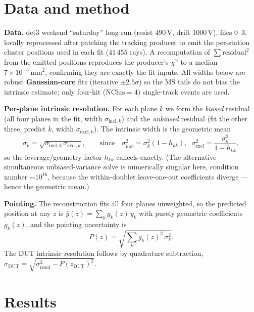 \documentclass[11pt]{article}
\newcommand{\mm}{\,\mathrm{mm}}
\begin{document}
\section{Data and method}
\textbf{Data.} det3 weekend ``saturday'' long run (resist $490$\,V, drift $1000$\,V), files
0--3, locally reprocessed after patching the tracking producer to emit the per-station cluster
positions used in each fit ($41\,455$ rays). A recomputation of $\sum\text{residual}^2$ from
the emitted positions reproduces the producer's $\chi^2$ to a median $7\times10^{-4}\mm^2$,
confirming they are exactly the fit inputs. All widths below are robust \textbf{Gaussian-core}
fits (iterative $\pm2.5\sigma$) so the MS tails do not bias the intrinsic estimate; only
four-hit ($\mathrm{NClus}=4$) single-track events are used.

\textbf{Per-plane intrinsic resolution.} For each plane $k$ we form the \emph{biased} residual
(all four planes in the fit, width $\sigma_{\mathrm{incl},k}$) and the \emph{unbiased} residual
(fit the other three, predict $k$, width $\sigma_{\mathrm{excl},k}$). The intrinsic width is the
geometric mean
\begin{equation}
\sigma_k=\sqrt{\sigma_{\mathrm{incl},k}\,\sigma_{\mathrm{excl},k}},
\qquad\text{since}\quad
\sigma_{\mathrm{incl}}^2=\sigma_k^2(1-h_{kk}),\;\;
\sigma_{\mathrm{excl}}^2=\frac{\sigma_k^2}{1-h_{kk}},
\end{equation}
so the leverage/geometry factor $h_{kk}$ cancels exactly. (The alternative simultaneous
unbiased-variance solve is numerically singular here, condition number $\sim\!10^{16}$, because
the within-doublet leave-one-out coefficients diverge --- hence the geometric mean.)

\textbf{Pointing.} The reconstruction fits all four planes unweighted, so the predicted position
at any $z$ is $\hat y(z)=\sum_k g_k(z)\,y_k$ with purely geometric coefficients $g_k(z)$, and the
pointing uncertainty is
\begin{equation}
P(z)=\sqrt{\textstyle\sum_k g_k(z)^2\,\sigma_k^2}.
\end{equation}
The DUT intrinsic resolution follows by quadrature subtraction,
$\sigma_\mathrm{DUT}=\sqrt{\sigma_\mathrm{resid}^2-P(z_\mathrm{DUT})^2}$.

\section{Results}
\end{document}
